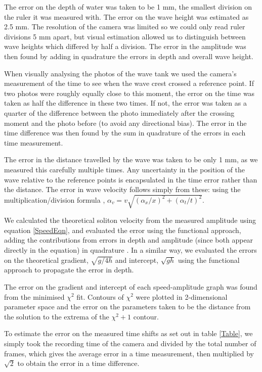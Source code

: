 \documentclass[10pt, twocolumn]{revtex4}    %
\begin{document}
The error on the depth of water was taken to be 1 mm, the smallest division on the ruler it was measured with. The error on the wave height was estimated as 2.5 mm. The resolution of the camera was limited so we could only read ruler divisions 5 mm apart, but visual estimation allowed us to distinguish between wave heights which differed by half a division. The error in the amplitude was then found by adding in quadrature the errors in depth and overall wave height. 

When visually analysing the photos of the wave tank we used the camera's measurement of the time to see when the wave crest crossed a reference point. If two photos were roughly equally close to this moment, the error on the time was taken as half the difference in these two times. If not, the error was taken as a quarter of the difference between the photo immediately after the crossing moment and the photo before (to avoid any directional bias). The error in the time difference was then found by the sum in quadrature of the errors in each time measurement. 

The error in the distance travelled by the wave was taken to be only 1 mm, as we measured this carefully multiple times. Any uncertainty in the position of the wave relative to the reference points is encapsulated in the time error rather than the distance. The error in wave velocity follows simply from these: using the multiplication/division formula \cite{Hughes}, $\alpha_v = v \sqrt{(\alpha_x/x)^2 + (\alpha_t/t)^2}$. 

We calculated the theoretical soliton velocity from the measured amplitude using equation \ref{SpeedEqn}, and evaluated the error using the functional approach, adding the contributions from errors in depth and amplitude (since both appear directly in the equation) in quadrature \cite{Hughes}. In a similar way, we evaluated the errors on the theoretical gradient, $\sqrt{g/4h}$ and intercept, $\sqrt{gh}$ using the functional approach to propagate the error in depth. 

The error on the gradient and intercept of each speed-amplitude graph was found from the minimised $\chi^2$ fit. Contours of $\chi^2$ were plotted in 2-dimensional parameter space and the error on the parameters taken to be the distance from the solution to the extrema of the $\chi^2+1$ contour. 

To estimate the error on the measured time shifts as set out in table \ref{Table}, we simply took the recording time of the camera and divided by the total number of frames, which gives the average error in a time measurement, then multiplied by $\sqrt{2}$ to obtain the error in a time difference. 
\end{document}
